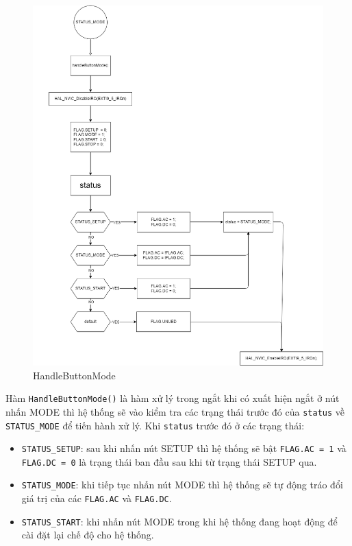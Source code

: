 \begin{figure}[H]
	\centering
	\includegraphics[width=\linewidth]{./diagram/handleButtonMode.png}
	\caption{HandleButtonMode}
	\label{f_handlebuttonmode}
\end{figure}

Hàm \texttt{HandleButtonMode()} là hàm xử lý trong ngắt khi có xuất hiện ngắt ở nút nhấn MODE thì hệ thống sẽ vào kiểm tra các trạng thái trước đó của \texttt{status} về \texttt{STATUS\_MODE} để tiến hành xử lý. Khi \texttt{status} trước đó ở các trạng thái:

\begin{itemize}[label = -]
	\item \texttt{STATUS\_SETUP}: sau khi nhấn nút SETUP thì hệ thống sẽ bật \texttt{FLAG.AC = 1} và \texttt{FLAG.DC = 0} là trạng thái ban đầu sau khi từ trạng thái SETUP qua.
	\item \texttt{STATUS\_MODE}: khi tiếp tục nhấn nút MODE thì hệ thống sẽ tự động tráo đổi giá trị của các \texttt{FLAG.AC} và \texttt{FLAG.DC}.
	\item \texttt{STATUS\_START}: khi nhấn nút MODE trong khi hệ thống đang hoạt động để cài đặt lại chế độ cho hệ thống.
\end{itemize}

